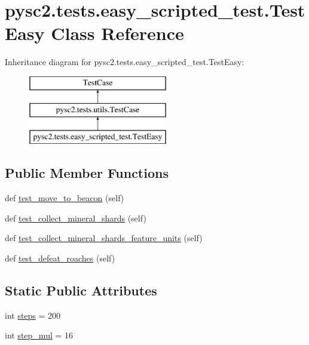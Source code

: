 \hypertarget{classpysc2_1_1tests_1_1easy__scripted__test_1_1_test_easy}{}\section{pysc2.\+tests.\+easy\+\_\+scripted\+\_\+test.\+Test\+Easy Class Reference}
\label{classpysc2_1_1tests_1_1easy__scripted__test_1_1_test_easy}
Inheritance diagram for pysc2.\+tests.\+easy\+\_\+scripted\+\_\+test.\+Test\+Easy\+:\begin{figure}[H]
\begin{center}
\leavevmode
\includegraphics[height=3.000000cm]{classpysc2_1_1tests_1_1easy__scripted__test_1_1_test_easy}
\end{center}
\end{figure}
\subsection*{Public Member Functions}
\begin{DoxyCompactItemize}
\item 
def \mbox{\hyperlink{classpysc2_1_1tests_1_1easy__scripted__test_1_1_test_easy_a53ebbfab405592290de3305fe675f5c3}{test\+\_\+move\+\_\+to\+\_\+beacon}} (self)
\item 
def \mbox{\hyperlink{classpysc2_1_1tests_1_1easy__scripted__test_1_1_test_easy_a9c8bc74aeeeda3f90f6f112c1f32768b}{test\+\_\+collect\+\_\+mineral\+\_\+shards}} (self)
\item 
def \mbox{\hyperlink{classpysc2_1_1tests_1_1easy__scripted__test_1_1_test_easy_a99f272d05a7ce04dc71706df70a7d4e2}{test\+\_\+collect\+\_\+mineral\+\_\+shards\+\_\+feature\+\_\+units}} (self)
\item 
def \mbox{\hyperlink{classpysc2_1_1tests_1_1easy__scripted__test_1_1_test_easy_a07a4825397ecbce5112a024843a5aeb7}{test\+\_\+defeat\+\_\+roaches}} (self)
\end{DoxyCompactItemize}
\subsection*{Static Public Attributes}
\begin{DoxyCompactItemize}
\item 
int \mbox{\hyperlink{classpysc2_1_1tests_1_1easy__scripted__test_1_1_test_easy_afd9dd7b88e7158ab14d8086ae572e330}{steps}} = 200
\item 
int \mbox{\hyperlink{classpysc2_1_1tests_1_1easy__scripted__test_1_1_test_easy_ae2a8b3a6f1f768ce20327daaba987658}{step\+\_\+mul}} = 16
\end{DoxyCompactItemize}


